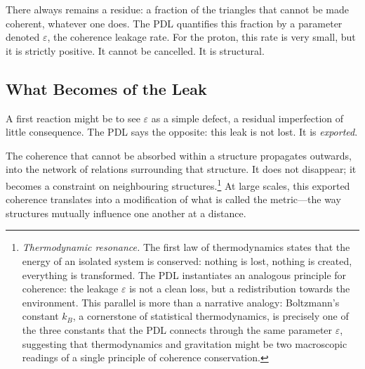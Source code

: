 \documentclass[12pt, a4paper, openright]{book}
\begin{document}
\medskip

There always remains a residue: a fraction of the triangles that cannot be made coherent, whatever one does. The PDL quantifies this fraction by a parameter denoted $\varepsilon$, the coherence leakage rate. For the proton, this rate is very small, but it is strictly positive. It cannot be cancelled. It is structural.

\subsection*{What Becomes of the Leak}

A first reaction might be to see $\varepsilon$ as a simple defect, a residual imperfection of little consequence. The PDL says the opposite: this leak is not lost. It is \emph{exported}.

\medskip

The coherence that cannot be absorbed within a structure propagates outwards, into the network of relations surrounding that structure. It does not disappear; it becomes a constraint on neighbouring structures.\footnote{\textit{Thermodynamic resonance.} The first law of thermodynamics states that the energy of an isolated system is conserved: nothing is lost, nothing is created, everything is transformed. The PDL instantiates an analogous principle for coherence: the leakage $\varepsilon$ is not a clean loss, but a redistribution towards the environment. This parallel is more than a narrative analogy: Boltzmann's constant $k_B$, a cornerstone of statistical thermodynamics, is precisely one of the three constants that the PDL connects through the same parameter $\varepsilon$, suggesting that thermodynamics and gravitation might be two macroscopic readings of a single principle of coherence conservation.} At large scales, this exported coherence translates into a modification of what is called the metric---the way structures mutually influence one another at a distance.

\medskip
\end{document}
